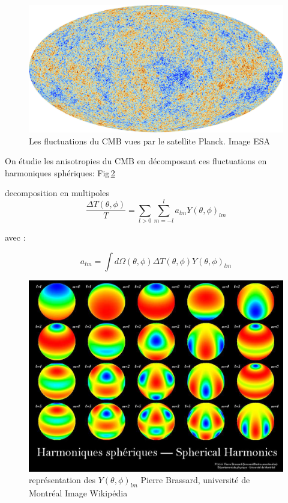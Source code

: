 \begin{figure}[htbp]
        \includegraphics[width=.95\linewidth]{img/01/CMB.jpeg} 
        \caption{Les fluctuations du CMB vues par le satellite Planck. 
        Image ESA}
 		\label{fig:cmb}
\end{figure}


On étudie les anisotropies du CMB en décomposant ces fluctuations en harmoniques sphériques:
Fig\,\ref{fig:harmoniques_spheriques}

decomposition en multipoles
\begin{equation}
 \frac{\Delta T(\theta,\phi)}{T} = \sum_{l>0} \sum_{m=-l}^l a_{lm} Y(\theta,\phi)_{lm}
\end{equation}

avec : 

\begin{equation}
a_{lm}= \int d\Omega(\theta,\phi) \Delta T (\theta,\phi) Y(\theta,\phi)_{lm}
\end{equation}

\begin{figure}[bth]
        \includegraphics[width=.95\linewidth]{img/01/harmoniques_spheriques.jpeg} 
        \caption{
        représentation des $Y(\theta,\phi)_{lm}$
 Pierre Brassard, université de Montréal 
        Image Wikipédia}
 		\label{fig:harmoniques_spheriques}
\end{figure}


